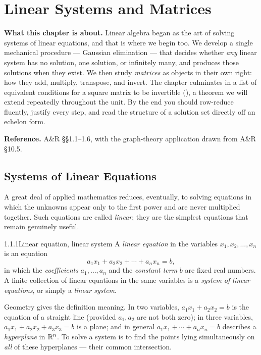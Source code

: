 \chapter{Linear Systems and Matrices}
\label{ch:linear-systems}

\begin{roadmap}
\noindent\textbf{What this chapter is about.}\;
Linear algebra began as the art of solving systems of linear equations, and that is where we begin too. We develop a single mechanical procedure --- Gaussian elimination --- that decides whether \emph{any} linear system has no solution, one solution, or infinitely many, and produces those solutions when they exist. We then study \emph{matrices} as objects in their own right: how they add, multiply, transpose, and invert. The chapter culminates in a list of equivalent conditions for a square matrix to be invertible (), a theorem we will extend repeatedly throughout the unit. By the end you should row-reduce fluently, justify every step, and read the structure of a solution set directly off an echelon form.
\medskip

\noindent\textbf{Reference.}\; A\&R \S\S1.1--1.6, with the graph-theory application drawn from A\&R \S10.5.
\end{roadmap}

\section{Systems of Linear Equations}
\label{sec:1.1}

A great deal of applied mathematics reduces, eventually, to solving equations in which the unknowns appear only to the first power and are never multiplied together. Such equations are called \emph{linear}; they are the simplest equations that remain genuinely useful.

\begin{defns}{1.1.1}{Linear equation, linear system}
A \emph{linear equation} in the variables $x_1,x_2,\dots,x_n$ is an equation
\[
a_1x_1 + a_2x_2 + \cdots + a_nx_n = b,
\]
in which the \emph{coefficients} $a_1,\dots,a_n$ and the \emph{constant term} $b$ are fixed real numbers. A finite collection of linear equations in the same variables is a \emph{system of linear equations}, or simply a \emph{linear system}.
\end{defns}

Geometry gives the definition meaning. In two variables, $a_1x_1+a_2x_2=b$ is the equation of a straight line (provided $a_1,a_2$ are not both zero); in three variables, $a_1x_1+a_2x_2+a_3x_3=b$ is a plane; and in general $a_1x_1+\cdots+a_nx_n=b$ describes a \emph{hyperplane} in $\mathbb{R}^n$. To solve a system is to find the points lying simultaneously on \emph{all} of these hyperplanes --- their common intersection.

